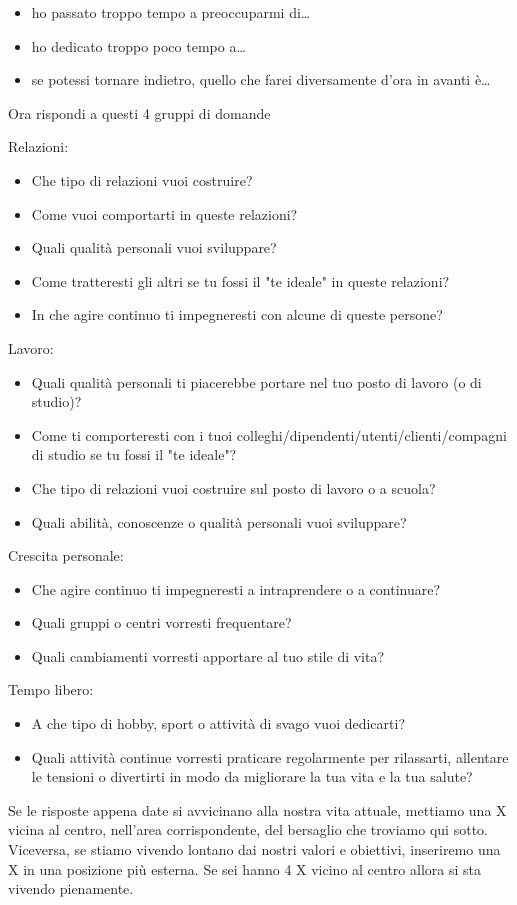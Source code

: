 \documentclass[12pt]{book} %
\begin{document}
\begin{itemize}
\item ho passato troppo tempo a preoccuparmi di… 
\item ho dedicato troppo poco tempo a… 
\item se potessi tornare indietro, quello che farei diversamente d'ora in avanti è…
\end{itemize}

Ora rispondi a questi 4 gruppi di domande

Relazioni:

\begin{itemize}
\item Che tipo di relazioni vuoi costruire? 
\item Come vuoi comportarti in queste relazioni? 
\item Quali qualità personali vuoi sviluppare? 
\item Come tratteresti gli altri se tu fossi il "te ideale" in queste
relazioni? 
\item In che agire continuo ti impegneresti con alcune di queste persone?
\end{itemize}
Lavoro:

\begin{itemize}
\item Quali qualità personali ti piacerebbe portare nel tuo posto di lavoro (o di studio)? 
\item Come ti comporteresti con i tuoi colleghi/dipendenti/utenti/clienti/compagni di studio se tu fossi il
"te ideale"? 
\item Che tipo di relazioni vuoi costruire sul posto di lavoro o a scuola? 
\item Quali abilità, conoscenze o qualità personali vuoi sviluppare?
\end{itemize}
Crescita personale:

\begin{itemize}
\item Che agire continuo ti impegneresti a intraprendere o a continuare? 
\item Quali gruppi o centri vorresti frequentare? 
\item Quali cambiamenti vorresti apportare al tuo stile di vita?
\end{itemize}
Tempo libero: 

\begin{itemize}
\item A che tipo di hobby, sport o attività di svago vuoi dedicarti? 
\item Quali attività continue vorresti praticare regolarmente per rilassarti, allentare le tensioni o divertirti in modo
da migliorare la tua vita e la tua salute?
\end{itemize}
Se le risposte appena date si avvicinano alla nostra vita attuale, mettiamo una X vicina al centro,
nell'area corrispondente, del bersaglio che troviamo qui sotto. Viceversa, se stiamo vivendo
lontano dai nostri valori e obiettivi, inseriremo una X in una posizione più esterna. Se sei hanno 4 X vicino al centro
allora si sta vivendo pienamente.
\end{document}
